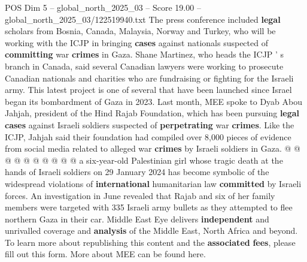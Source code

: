 \begin{textsample}{POS Dim 5 – global\_north\_2025\_03 – Score 19.00 – global\_north\_2025\_03/122519940.txt}
The press conference included \textbf{legal} scholars from Bosnia, Canada, Malaysia, Norway and Turkey, who will be working with the ICJP in bringing \textbf{cases} against nationals suspected of \textbf{committing} war \textbf{crimes} in Gaza.
Shane Martinez, who heads the ICJP ' s branch in Canada, said several Canadian lawyers were working to prosecute Canadian nationals and charities who are fundraising or fighting for the Israeli army.
This latest project is one of several that have been launched since Israel began its bombardment of Gaza in 2023.
Last month, MEE spoke to Dyab Abou Jahjah, president of the Hind Rajab Foundation, which has been pursuing \textbf{legal} \textbf{cases} against Israeli soldiers suspected of \textbf{perpetrating} war \textbf{crimes}.
Like the ICJP, Jahjah said their foundation had compiled over 8,000 pieces of evidence from social media related to alleged war \textbf{crimes} by Israeli soldiers in Gaza. @ @ @ @ @ @ @ @ @ @ a six-year-old Palestinian girl whose tragic death at the hands of Israeli soldiers on 29 January 2024 has become symbolic of the widespread violations of \textbf{international} humanitarian law \textbf{committed} by Israeli forces.
An investigation in June revealed that Rajab and six of her family members were targeted with 335 Israeli army bullets as they attempted to flee northern Gaza in their car.
Middle East Eye delivers \textbf{independent} and unrivalled coverage and \textbf{analysis} of the Middle East, North Africa and beyond.
To learn more about republishing this content and the \textbf{associated} \textbf{fees}, please fill out this form.
More about MEE can be found here.

\end{textsample}
